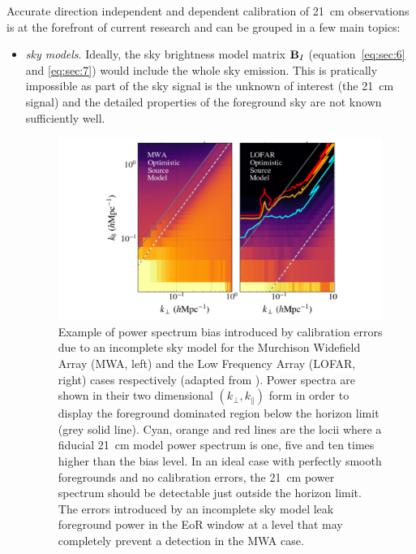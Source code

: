 Accurate direction independent and dependent calibration of 21~cm observations is at the forefront of current research and can be grouped in a few main topics:
%
\begin{itemize}
\item {\it sky models}. Ideally, the sky brightness model matrix ${\bf B}_I$ (equation~\ref{eq:sec:6} and \ref{eq:sec:7}) would include the whole sky emission. This is pratically impossible as part of the sky signal is the unknown of interest (the 21~cm signal) and the detailed properties of the foreground sky are not known sufficiently well. \begin{figure}[]
\begin{center}
\includegraphics[width=1.\textwidth]{Bernardi/calibration_errors}
\end{center}
\caption{Example of power spectrum bias introduced by calibration errors due to an incomplete sky model for the Murchison Widefield Array (MWA, left) and the Low Frequency Array (LOFAR, right) cases respectively (adapted from \cite{ewall-wice17}). Power spectra are shown in their two dimensional $(k_\perp,k_\parallel)$ form in order to display the foreground dominated region below the horizon limit (grey solid line). Cyan, orange and red lines are the locii where a fiducial 21~cm model power spectrum is one, five and ten times higher than the bias level. In an ideal case with perfectly smooth foregrounds and no calibration errors, the 21~cm power spectrum should be detectable just outside the horizon limit. The errors introduced by an incomplete sky model leak foreground power in the EoR window at a level that may completely prevent a detection in the MWA case.}
\label{fig:fig_added}
\end{figure}

\end{itemize}
